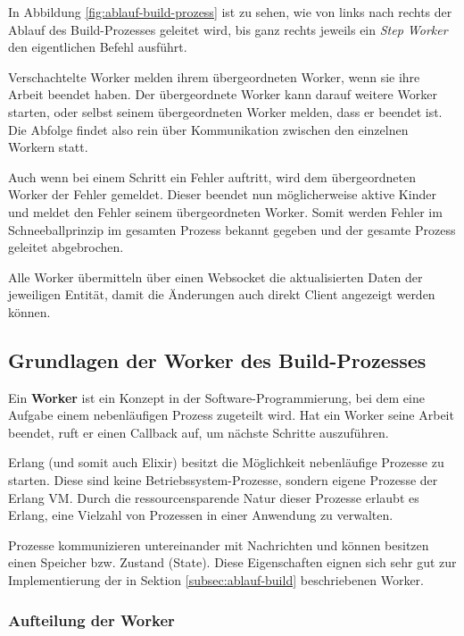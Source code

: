 In Abbildung \ref{fig:ablauf-build-prozess} ist zu sehen, wie von links nach rechts der Ablauf des Build-Prozesses geleitet wird, bis ganz rechts jeweils ein \emph{Step Worker} den eigentlichen Befehl ausführt.

Verschachtelte Worker melden ihrem übergeordneten Worker, wenn sie ihre Arbeit beendet haben. Der übergeordnete Worker kann darauf weitere Worker starten, oder selbst seinem übergeordneten Worker melden, dass er beendet ist. Die Abfolge findet also rein über Kommunikation zwischen den einzelnen Workern statt.

Auch wenn bei einem Schritt ein Fehler auftritt, wird dem übergeordneten Worker der Fehler gemeldet. Dieser beendet nun möglicherweise aktive Kinder und meldet den Fehler seinem übergeordneten Worker. Somit werden Fehler im Schneeballprinzip im gesamten Prozess bekannt gegeben und der gesamte Prozess geleitet abgebrochen.

Alle Worker übermitteln über einen Websocket die aktualisierten Daten der jeweiligen Entität, damit die Änderungen auch direkt Client angezeigt werden können.

\subsection{Grundlagen der Worker des Build-Prozesses}

Ein \textbf{Worker} ist ein Konzept in der Software-Programmierung, bei dem eine Aufgabe einem nebenläufigen Prozess zugeteilt wird. Hat ein Worker seine Arbeit beendet, ruft er einen Callback auf, um nächste Schritte auszuführen.

Erlang (und somit auch Elixir) besitzt die Möglichkeit nebenläufige Prozesse zu starten. Diese sind keine Betriebssystem-Prozesse, sondern eigene Prozesse der Erlang VM. Durch die ressourcensparende Natur dieser Prozesse erlaubt es Erlang, eine Vielzahl von Prozessen in einer Anwendung zu verwalten. \citep[133]{Armstrong2007}

Prozesse kommunizieren untereinander mit Nachrichten und können besitzen einen Speicher bzw. Zustand (State). Diese Eigenschaften eignen sich sehr gut zur Implementierung der in Sektion \ref{subsec:ablauf-build} beschriebenen Worker.

\subsubsection{Aufteilung der Worker}
\label{subsec:aufteilung-der-worker}

